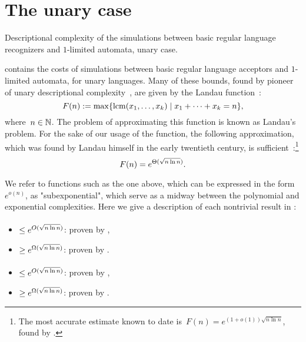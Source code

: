 \section{The unary case}\label{sec:sims-unary}

\begin{table}
	\centering
	\caption{Descriptional complexity of the simulations between basic regular language recognizers and $1$-limited automata, unary case.}
	\label{tab:sims-1la-unary}
\end{table}

 contains the costs of simulations between basic regular language acceptors and $1$-limited automata, for unary languages.
Many of these bounds, found by pioneer of unary descriptional complexity~, are given by the Landau function~\cite{Chr86}:
\begin{equation}
	F(n) := \max\{\operatorname{lcm}(x_1,\dots,x_k)\mid x_1+\dots+x_k=n\} \text,
\end{equation}
where~$n\in\mathbb N$.
The problem of approximating this function is known as Landau's problem.
For the sake of our usage of the function, the following approximation, which was found by Landau himself in the early twentieth century, is sufficient~\cite{Lan03,Lan09}:\footnote{%
	The most accurate estimate known to date is~$F(n) = e^{(1+o(1))\sqrt{n\ln n}}$, found by .}
\begin{equation}
	F(n) = e^{\Theta(\sqrt{n\ln n})} \text.
\end{equation}

We refer to functions such as the one above, which can be expressed in the form~$e^{o(n)}$, as "subexponential", which serve as a midway between the polynomial and exponential complexities.
Here we give a description of each nontrivial result in :

\paragraph{\ONFA{}\tto\ODFA}
\begin{itemize}
	\item $\le e^{O(\sqrt{n\ln n})}$: proven by ,
	\item $\ge e^{\Omega(\sqrt{n\ln n})}$: proven by .
\end{itemize}
\paragraph{\TDFA{}\tto\ODFA}\label{cost:2DFAto1DFAu}
\begin{itemize}
	\item $\le e^{O(\sqrt{n\ln n})}$: proven by ,
	\item $\ge e^{\Omega(\sqrt{n\ln n})}$: proven by .
\end{itemize}
